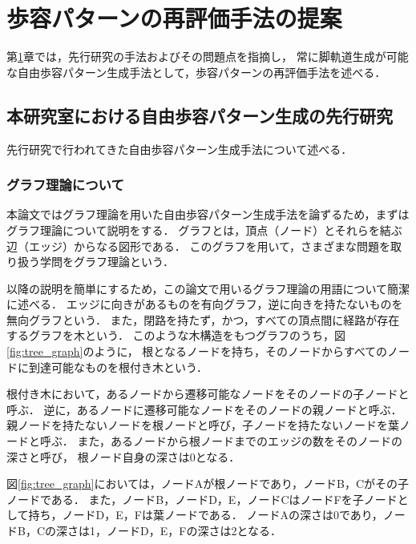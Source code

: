 ﻿%


\chapter{歩容パターンの再評価手法の提案}\label{chapter:歩容パターンの再評価手法の提案}
第\ref{chapter:歩容パターンの再評価手法の提案}章では，先行研究の手法およびその問題点を指摘し，
常に脚軌道生成が可能な自由歩容パターン生成手法として，歩容パターンの再評価手法を述べる．

\section{本研究室における自由歩容パターン生成の先行研究}
先行研究で行われてきた自由歩容パターン生成手法について述べる．

\subsection{グラフ理論について}
本論文ではグラフ理論を用いた自由歩容パターン生成手法を論ずるため，まずはグラフ理論について説明をする．
グラフとは，頂点（ノード）とそれらを結ぶ辺（エッジ）からなる図形である．
このグラフを用いて，さまざまな問題を取り扱う学問をグラフ理論という．

以降の説明を簡単にするため，この論文で用いるグラフ理論の用語について簡潔に述べる．
エッジに向きがあるものを有向グラフ，逆に向きを持たないものを無向グラフという．
また，閉路を持たず，かつ，すべての頂点間に経路が存在するグラフを木という．
このような木構造をもつグラフのうち，図\ref*{fig:tree_graph}のように，
根となるノードを持ち，そのノードからすべてのノードに到達可能なものを根付き木という．

根付き木において，あるノードから遷移可能なノードをそのノードの子ノードと呼ぶ．
逆に，あるノードに遷移可能なノードをそのノードの親ノードと呼ぶ．
親ノードを持たないノードを根ノードと呼び，子ノードを持たないノードを葉ノードと呼ぶ．
また，あるノードから根ノードまでのエッジの数をそのノードの深さと呼び，
根ノード自身の深さは0となる．

図\ref*{fig:tree_graph}においては，ノードAが根ノードであり，ノードB，Cがその子ノードである．
また，ノードB，ノードD，E，ノードCはノードFを子ノードとして持ち，ノードD，E，Fは葉ノードである．
ノードAの深さは0であり，ノードB，Cの深さは1，ノードD，E，Fの深さは2となる．

